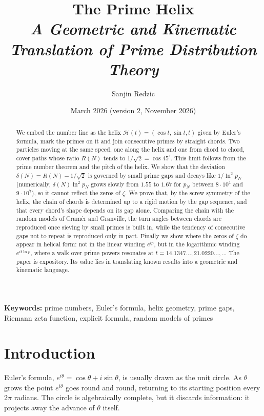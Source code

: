 \documentclass[11pt,a4paper]{article}
\title{\textbf{The Prime Helix}\\[4pt]
\large\itshape A Geometric and Kinematic Translation of Prime Distribution Theory}
\author{Sanjin Redzic}
\date{March 2026 \quad (version 2, November 2026)}
\theoremstyle{remark}
\theoremstyle{definition}
\newcommand{\Hc}{\mathcal{H}}
\newcommand{\dg}{^\circ}
\begin{document}
\maketitle
\thispagestyle{fancy}

\begin{abstract}
\noindent We embed the number line as the helix $\Hc(t)=(\cos t,\sin t,t)$ given by Euler's formula, mark the primes on it and join consecutive primes by straight chords. Two particles moving at the same speed, one along the helix and one from chord to chord, cover paths whose ratio $R(N)$ tends to $1/\sqrt2=\cos 45\dg$. This limit follows from the prime number theorem and the pitch of the helix. We show that the deviation $\delta(N)=R(N)-1/\sqrt2$ is governed by small prime gaps and decays like $1/\ln^2 p_N$ (numerically, $\delta(N)\ln^2 p_N$ grows slowly from $1.55$ to $1.67$ for $p_N$ between $8\cdot10^4$ and $9\cdot10^7$), so it cannot reflect the zeros of $\zeta$. We prove that, by the screw symmetry of the helix, the chain of chords is determined up to a rigid motion by the gap sequence, and that every chord's shape depends on its gap alone. Comparing the chain with the random models of Cram\'er and Granville, the turn angles between chords are reproduced once sieving by small primes is built in, while the tendency of consecutive gaps not to repeat is reproduced only in part. Finally we show where the zeros of $\zeta$ do appear in helical form: not in the linear winding $e^{ip}$, but in the logarithmic winding $e^{it\ln p}$, where a walk over prime powers resonates at $t=14.1347\ldots,21.0220\ldots,\ldots$ The paper is expository. Its value lies in translating known results into a geometric and kinematic language.
\end{abstract}

\noindent\textbf{Keywords:} prime numbers, Euler's formula, helix geometry, prime gaps, Riemann zeta function, explicit formula, random models of primes

\section{Introduction}

Euler's formula, $e^{i\theta}=\cos\theta+i\sin\theta$, is usually drawn as the unit circle. As $\theta$ grows the point $e^{i\theta}$ goes round and round, returning to its starting position every $2\pi$ radians. The circle is algebraically complete, but it discards information: it projects away the advance of $\theta$ itself.
\end{document}

